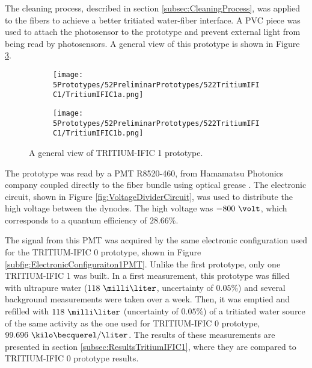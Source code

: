 The cleaning process, described in section \ref{subsec:CleaningProcess}, was applied to the fibers to achieve a better tritiated water-fiber interface. A PVC piece was used to attach the photosensor to the prototype and prevent external light from being read by photosensors. A general view of this prototype is shown in Figure \ref{fig:TritumIFIC1}.

\begin{figure}
\centering
    \begin{subfigure}[b]{0.40\textwidth}
    \centering
    \texttt{[image: 5Prototypes/52PreliminarPrototypes/522TritiumIFIC1/TritiumIFIC1a.png]}  
    \caption{\label{subfig:TritumIFIC1a}}
    \end{subfigure}
    \hfill
    \begin{subfigure}[b]{0.40\textwidth}
    \centering
    \texttt{[image: 5Prototypes/52PreliminarPrototypes/522TritiumIFIC1/TritiumIFIC1b.png]}  
    \caption{\label{subfig:TritumIFIC1b}}
    \end{subfigure}
 \caption{A general view of TRITIUM-IFIC 1 prototype.}
 \label{fig:TritumIFIC1}
\end{figure}

The prototype was read by a PMT R8520-460, from Hamamatsu Photonics company \cite{DataSheetPMTs} coupled directly to the fiber bundle using optical grease \cite{OpticalGrease}. The electronic circuit, shown in Figure \ref{fig:VoltageDividerCircuit}, was used to distribute the high voltage between the dynodes. The high voltage was $-800~\volt$, which corresponds to a quantum efficiency of $28.66\%$.

The signal from this PMT was acquired by the same electronic configuration used for the TRITIUM-IFIC 0 prototype, shown in Figure \ref{subfig:ElectronicConfiguraiton1PMT}. Unlike the first prototype, only one TRITIUM-IFIC 1 was built. In a first measurement, this prototype was filled with ultrapure water ($118~\milli\liter$, uncertainty of $0.05\%$) and several background measurements were taken over a week. Then, it was emptied and refilled with $118~\milli\liter$ (uncertainty of $0.05\%$) of a tritiated water source of the same activity as the one used for TRITIUM-IFIC 0 prototype, $99.696~\kilo\becquerel/\liter$. The results of these measurements are presented in section \ref{subsec:ResultsTritiumIFIC1}, where they are compared to TRITIUM-IFIC 0 prototype results.
